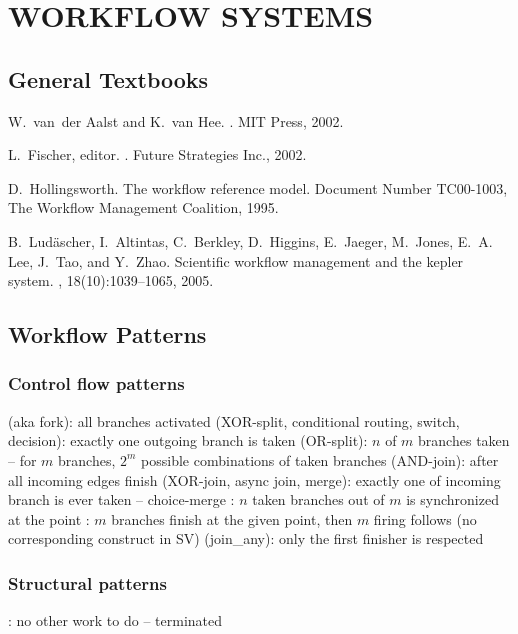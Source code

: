 \documentclass{myproc}
\begin{document}
\section{WORKFLOW SYSTEMS}
\subsection{General Textbooks}
\bit
\w W.~van~der Aalst and K.~van Hee.
.
\newblock MIT Press, 2002.

\w L.~Fischer, editor.
.
\newblock Future Strategies Inc., 2002.

\w D.~Hollingsworth.
\newblock The workflow reference model.
\newblock Document Number TC00-1003, The Workflow Management Coalition, 1995.

\w B.~Lud\"{a}scher, I.~Altintas, C.~Berkley, D.~Higgins, E.~Jaeger, M.~Jones,
  E.~A. Lee, J.~Tao, and Y.~Zhao.
\newblock Scientific workflow management and the {\sc kepler} system.
,
  18(10):1039--1065, 2005.
\eit

\subsection{Workflow Patterns}
\subsubsection{Control flow patterns}
\bit
\w {}
\w {} (aka fork): all branches activated
\w {} (XOR-split, conditional routing, switch, decision):
    exactly one outgoing branch is taken
\w {} (OR-split): $n$ of $m$ branches taken -- for $m$ branches,
$2^m$ possible combinations of taken branches
\w {} (AND-join): after all incoming edges finish
\w {} (XOR-join, async join, merge): exactly one of incoming
branch is ever taken -- choice-merge
\w {}: $n$ taken branches out of $m$ is synchronized at
the point
\w {}: $m$ branches finish at the given point, then $m$ firing
follows (no corresponding construct in SV)
\w {} (join\_any): only the first finisher is respected
\eit

\subsubsection{Structural patterns}
\bit
\w {}
\w {}: no other work to do -- terminated
\eit
\end{document}
